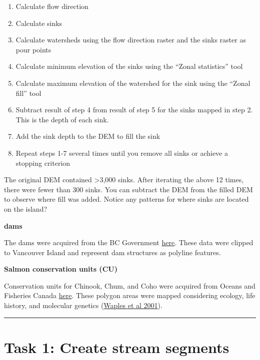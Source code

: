 \documentclass[
]{book}
\providecommand{\tightlist}{%
  \setlength{\itemsep}{0pt}\setlength{\parskip}{0pt}}
\begin{document}
\begin{enumerate}
\def\labelenumi{\arabic{enumi}.}
\tightlist
\item
  Calculate flow direction
\item
  Calculate sinks
\item
  Calculate watersheds using the flow direction raster and the sinks raster as pour points
\item
  Calculate minimum elevation of the sinks using the ``Zonal statistics'' tool
\item
  Calculate maximum elevation of the watershed for the sink using the ``Zonal fill'' tool
\item
  Subtract result of step 4 from result of step 5 for the sinks mapped in step 2. This is the depth of each sink.
\item
  Add the sink depth to the DEM to fill the sink
\item
  Repeat steps 1-7 several times until you remove all sinks or achieve a stopping criterion
\end{enumerate}

The original DEM contained \textgreater3,000 sinks. After iterating the above 12 times, there were fewer than 300 sinks. You can subtract the DEM from the filled DEM to observe where fill was added. Notice any patterns for where sinks are located on the island?

\textbf{dams}

The dams were acquired from the BC Government \href{https://catalogue.data.gov.bc.ca/dataset/bc-dams}{here}. These data were clipped to Vancouver Island and represent dam structures as polyline features.

\textbf{Salmon conservation units (CU)}

Conservation units for Chinook, Chum, and Coho were acquired from Oceans and Fisheries Canada \href{https://open.canada.ca/data/en/dataset/1ac00a39-4770-443d-8a6b-9656c06df6a3\#wb-auto-6}{here}. These polygon areas were mapped considering ecology, life history, and molecular genetics (\href{https://onlinelibrary.wiley.com/doi/abs/10.1111/j.1095-8649.2001.tb01376.x}{Waples et al 2001}).

\begin{center}\rule{0.5\linewidth}{0.5pt}\end{center}

\hypertarget{task-1-create-stream-segments}{%
\section*{Task 1: Create stream segments}\label{task-1-create-stream-segments}}
\end{document}
